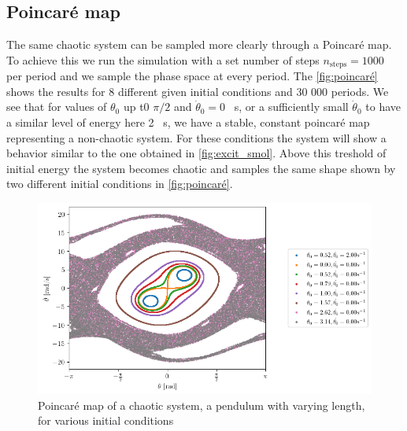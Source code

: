 \subsection{Poincaré map}
The same chaotic system can be sampled more clearly through a Poincaré map. To achieve this we run the simulation with a set number of steps $n_\mathrm{steps} = 1000$ per period and we sample the phase space at every period. The \autoref{fig:poincaré} shows the results for 8 different given initial conditions and 30 000 periods. We see that for values of $\theta_0$ up t0 $\pi / 2$ and $\dot\theta_0 = 0$ \si{\per\second}, or a sufficiently small $\dot\theta_0$ to have a similar level of energy here 2 \si{\per\second}, we have a stable, constant poincaré map representing a non-chaotic system. For these conditions the system will show a behavior similar to the one obtained in \autoref{fig:excit_smol}. Above this treshold of initial energy the system becomes chaotic and samples the same shape shown by two different initial conditions in \autoref{fig:poincaré}.
\begin{figure}[h]
    \centering
    \includegraphics[width=\linewidth]{figures/poincare_overkill.png}
    \caption{Poincaré map of a chaotic system, a pendulum with varying length, for various initial conditions}
    \label{fig:poincaré}
\end{figure}





